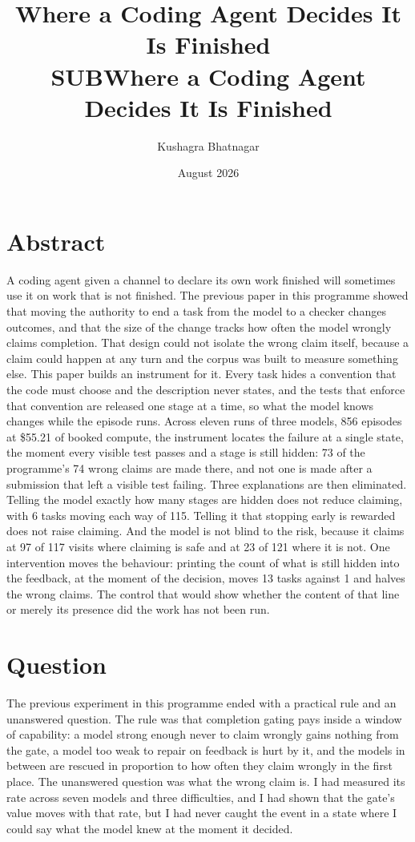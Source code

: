 \documentclass[11pt]{article}
\title{\LARGE Where a Coding Agent Decides It Is Finished\\[3pt]\large SUBWhere a Coding Agent Decides It Is Finished}
\author{Kushagra Bhatnagar}
\date{August 2026}
\begin{document}
\maketitle


\section*{\centering Abstract}

A coding agent given a channel to declare its own work finished will sometimes use it on work that is not finished. The previous paper in this programme showed that moving the authority to end a task from the model to a checker changes outcomes, and that the size of the change tracks how often the model wrongly claims completion. That design could not isolate the wrong claim itself, because a claim could happen at any turn and the corpus was built to measure something else. This paper builds an instrument for it. Every task hides a convention that the code must choose and the description never states, and the tests that enforce that convention are released one stage at a time, so what the model knows changes while the episode runs. Across eleven runs of three models, 856 episodes at \$55.21 of booked compute, the instrument locates the failure at a single state, the moment every visible test passes and a stage is still hidden: 73 of the programme's 74 wrong claims are made there, and not one is made after a submission that left a visible test failing. Three explanations are then eliminated. Telling the model exactly how many stages are hidden does not reduce claiming, with 6 tasks moving each way of 115. Telling it that stopping early is rewarded does not raise claiming. And the model is not blind to the risk, because it claims at 97 of 117 visits where claiming is safe and at 23 of 121 where it is not. One intervention moves the behaviour: printing the count of what is still hidden into the feedback, at the moment of the decision, moves 13 tasks against 1 and halves the wrong claims. The control that would show whether the content of that line or merely its presence did the work has not been run.

\section{Question}

The previous experiment in this programme ended with a practical rule and an unanswered question. The rule was that completion gating pays inside a window of capability: a model strong enough never to claim wrongly gains nothing from the gate, a model too weak to repair on feedback is hurt by it, and the models in between are rescued in proportion to how often they claim wrongly in the first place. The unanswered question was what the wrong claim is. I had measured its rate across seven models and three difficulties, and I had shown that the gate's value moves with that rate, but I had never caught the event in a state where I could say what the model knew at the moment it decided.
\end{document}
